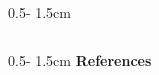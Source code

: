 \documentclass{uibposter}
\begin{document}
\begin{frame}[fragile]
\begin{columns}
\begin{column}{0.5\textwidth - 1.5cm}
\begin{column}{0.5\textwidth - 1.5cm}
    \vspace{0.5cm}
    \textbf{\scriptsize{References}}
    \vspace{0.3cm}
    \nocite{*}
    
    
    

\end{column}
\end{column}
\end{columns}





\end{frame}
\end{document}
